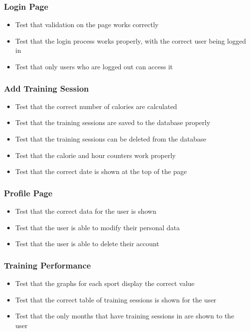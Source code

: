 \documentclass{article}[12pt,a4paper]
\begin{document}
\subsubsection{Login Page}
\begin{itemize}
  \item Test that validation on the page works correctly
  \item Test that the login process works properly, with the correct user being logged in
  \item Test that only users who are logged out can access it
\end{itemize}

\subsubsection{Add Training Session}
\begin{itemize}
  \item Test that the correct number of calories are calculated
  \item Test that the training sessions are saved to the database properly
  \item Test that the training sessions can be deleted from the database
  \item Test that the calorie and hour counters work properly
  \item Test that the correct date is shown at the top of the page
\end{itemize}

\subsubsection{Profile Page}
\begin{itemize}
  \item Test that the correct data for the user is shown
  \item Test that the user is able to modify their personal data
  \item Test that the user is able to delete their account
\end{itemize}

\subsubsection{Training Performance}
\begin{itemize}
  \item Test that the graphs for each sport display the correct value
  \item Test that the correct table of training sessions is shown for the user
  \item Test that the only months that have training sessions in are shown to the user
\end{itemize}
\end{document}
